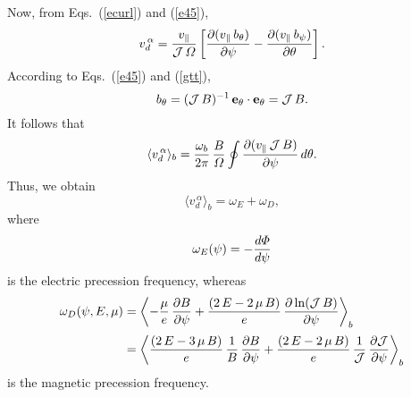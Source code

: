 \documentclass[12pt,prb,aps,notitlepage]{revtex4-1}
\begin{document}
 Now, from Eqs.~(\ref{ecurl}) and (\ref{e45}), 
 \begin{equation}
 v_d^{\,\alpha}= \frac{v_\parallel}{{\cal J}\,{\mit\Omega}}\left[\frac{\partial (v_\parallel\,b_\theta)}{\partial\psi} - \frac{\partial (v_\parallel\,b_\psi)}{\partial \theta}\right].
 \end{equation}
 According to Eqs.~(\ref{e45}) and (\ref{gtt}), 
 \begin{equation}
 b_\theta = ({\cal J}\,B)^{-1}\,{\bf e}_\theta\cdot{\bf e}_\theta= {\cal J}\,B.
 \end{equation}
It follows that
 \begin{equation}
 \langle v_d^{\,\alpha}\rangle_b = \frac{\omega_b}{2\pi}\,\frac{B}{{\mit\Omega}}\oint\frac{\partial (v_\parallel\,{\cal J}\,B)}{\partial\psi}\,d\theta.
 \end{equation}
Thus, we obtain 
 \begin{equation}\label{e98}
  \langle v_d^{\,\alpha}\rangle_b=\omega_E +\omega_D, 
 \end{equation}
 where 
 \begin{equation}
 \omega_E(\psi)= -\frac{d{\mit\Phi}}{d\psi}
 \end{equation}
 is the  electric precession frequency, whereas 
 \begin{align}\label{prec}
 \omega_D(\psi,E,\mu)&=\left\langle- \frac{\mu}{e}\,\frac{\partial B}{\partial\psi} +\frac{(2\,E-2\,\mu\,B)}{e}\,\frac{\partial \ln({\cal J}\,B)}{\partial\psi}
 \right\rangle_b\nonumber\\[0.5ex]
 &=\left\langle\frac{(2\,E-3\,\mu\,B)}{e}\,\frac{1}{B}\,\frac{\partial B}{\partial\psi} +\frac{(2\,E-2\,\mu\,B)}{e}\,\frac{1}{\cal J}\,\frac{\partial{\cal J}}{\partial\psi}
 \right\rangle_b
 \end{align}
 is the magnetic precession frequency. 
 
\end{document}
